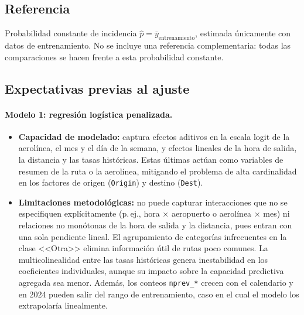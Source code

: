 \documentclass[11pt,a4paper]{article}
\begin{document}
\subsection{Referencia}
Probabilidad constante de incidencia $\hat p = \bar y_{\text{entrenamiento}}$, estimada únicamente con datos de entrenamiento. No se incluye una referencia complementaria: todas las comparaciones se hacen frente a esta probabilidad constante.
 
\subsection{Expectativas previas al ajuste}
 
\paragraph{Modelo 1: regresión logística penalizada.}
\begin{itemize}
  \item \textbf{Capacidad de modelado:} captura efectos aditivos en la escala logit de la aerolínea, el mes y el día de la semana, y efectos lineales de la hora de salida, la distancia y las tasas históricas. Estas últimas actúan como variables de resumen de la ruta o la aerolínea, mitigando el problema de alta cardinalidad en los factores de origen (\texttt{Origin}) y destino (\texttt{Dest}).
  \item \textbf{Limitaciones metodológicas:} no puede capturar interacciones que no se especifiquen explícitamente (p.\,ej., hora $\times$ aeropuerto o aerolínea $\times$ mes) ni relaciones no monótonas de la hora de salida y la distancia, pues entran con una sola pendiente lineal. El agrupamiento de categorías infrecuentes en la clase <<Otra>> elimina información útil de rutas poco comunes. La multicolinealidad entre las tasas históricas genera inestabilidad en los coeficientes individuales, aunque su impacto sobre la capacidad predictiva agregada sea menor. Además, los conteos \texttt{nprev\_*} crecen con el calendario y en 2024 pueden salir del rango de entrenamiento, caso en el cual el modelo los extrapolaría linealmente.
\end{itemize}
 
\end{document}
